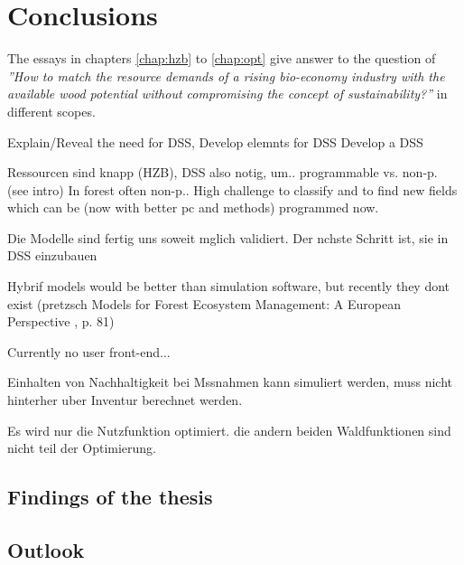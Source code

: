 \chapter{Conclusions}
\label{chap:discussion}
\newpage
\noindent
The essays in chapters \ref{chap:hzb} to \ref{chap:opt} give answer to the question of \textit{''How to match the resource demands of a rising bio-economy industry with the available wood potential without compromising the concept of sustainability?''} in different scopes.

Explain/Reveal the need for DSS, 
Develop elemnts for DSS
Develop a DSS

Ressourcen sind knapp (HZB), DSS also notig, um..
programmable vs. non-p. (see intro) In forest often non-p.. High challenge to classify and to find new fields which can be (now with better pc and methods) programmed now.

Die Modelle sind fertig uns soweit mglich validiert. Der nchste Schritt ist, sie in DSS einzubauen

Hybrif models would be better than simulation software, but recently they dont exist (pretzsch Models for Forest Ecosystem Management: A European Perspective
, p. 81)

Currently no user front-end...

Einhalten von Nachhaltigkeit bei Mssnahmen kann simuliert werden, muss nicht hinterher uber Inventur berechnet werden.

Es wird nur die Nutzfunktion optimiert. die andern beiden Waldfunktionen sind nicht teil der Optimierung.
\section{Findings of the thesis}
\label{sec:discussion:findings}
\section{Outlook}
\label{sec:discussion:outlook}